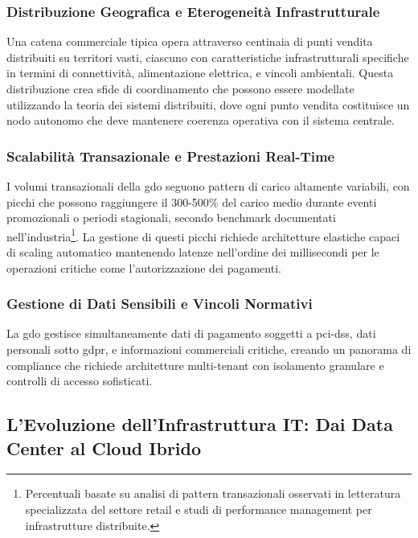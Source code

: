 \subsubsection{Distribuzione Geografica e Eterogeneità Infrastrutturale}

Una catena commerciale tipica opera attraverso centinaia di punti vendita distribuiti su territori vasti, ciascuno con caratteristiche infrastrutturali specifiche in termini di connettività, alimentazione elettrica, e vincoli ambientali. Questa distribuzione crea sfide di coordinamento che possono essere modellate utilizzando la teoria dei sistemi distribuiti, dove ogni punto vendita costituisce un nodo autonomo che deve mantenere coerenza operativa con il sistema centrale.

\subsubsection{Scalabilità Transazionale e Prestazioni Real-Time}

I volumi transazionali della \gls{gdo} seguono pattern di carico altamente variabili, con picchi che possono raggiungere il 300-500\% del carico medio durante eventi promozionali o periodi stagionali, secondo benchmark documentati nell'industria\footnote{Percentuali basate su analisi di pattern transazionali osservati in letteratura specializzata del settore retail e studi di performance management per infrastrutture distribuite.}. La gestione di questi picchi richiede architetture elastiche capaci di scaling automatico mantenendo latenze nell'ordine dei millisecondi per le operazioni critiche come l'autorizzazione dei pagamenti.

\subsubsection{Gestione di Dati Sensibili e Vincoli Normativi}

La \gls{gdo} gestisce simultaneamente dati di pagamento soggetti a \gls{pci-dss}, dati personali sotto \gls{gdpr}, e informazioni commerciali critiche, creando un panorama di compliance che richiede architetture multi-tenant con isolamento granulare e controlli di accesso sofisticati.

\subsection{L'Evoluzione dell'Infrastruttura IT: Dai Data Center al Cloud Ibrido}
\label{subsec:evoluzione-infrastruttura}

